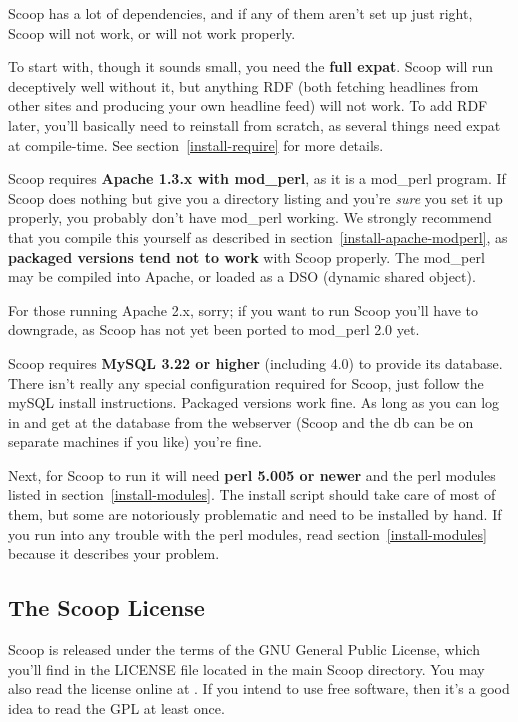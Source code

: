 Scoop has a lot of dependencies, and if any of them aren't set up just right, Scoop will not work, or will not work properly.

To start with, though it sounds small, you need the {\bf full expat}.  Scoop will run deceptively well without it, but anything RDF (both fetching headlines from other sites and producing your own headline feed) will not work.  To add RDF later, you'll basically need to reinstall from scratch, as several things need expat at compile-time.  See section~\ref{install-require} for more details.

Scoop requires {\bf Apache 1.3.x with mod\_perl}, as it is a mod\_perl program.  If Scoop does nothing but give you a directory listing and you're {\em sure} you set it up properly, you probably don't have mod\_perl working.  We strongly recommend that you compile this yourself as described in section~\ref{install-apache-modperl}, as {\bf packaged versions tend not to work} with Scoop properly.  The mod\_perl may be compiled into Apache, or loaded as a DSO (dynamic shared object).

For those running Apache 2.x, sorry; if you want to run Scoop you'll have to downgrade, as Scoop has not yet been ported to mod\_perl 2.0 yet.

Scoop requires {\bf MySQL 3.22 or higher} (including 4.0) to provide its database.  There isn't really any special configuration required for Scoop, just follow the mySQL install instructions.  Packaged versions work fine.  As long as you can log in and get at the database from the webserver (Scoop and the db can be on separate machines if you like) you're fine.

Next, for Scoop to run it will need {\bf perl 5.005 or newer} and the perl modules listed in section~\ref{install-modules}.  The install script should take care of most of them, but some are notoriously problematic and need to be installed by hand.  If you run into any trouble with the perl modules, read section~\ref{install-modules} because it describes your problem.

\subsection{The Scoop License}

Scoop is released under the terms of the GNU General Public License, which you'll find in the LICENSE file located in the main Scoop directory. You may also read the license online at . If you intend to use free software, then it's a good idea to read the GPL at least once.

